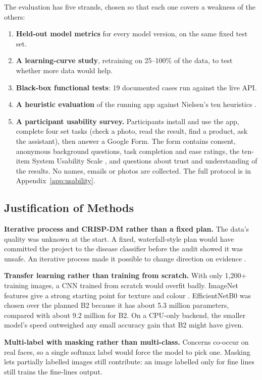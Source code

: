 The evaluation has five strands, chosen so that each one covers a weakness of the others:
\begin{enumerate}
  \item \textbf{Held-out model metrics} for every model version, on the same fixed test set.
  \item \textbf{A learning-curve study}, retraining on 25--100\% of the data, to test whether more data would help.
  \item \textbf{Black-box functional tests}: 19 documented cases run against the live API.
  \item \textbf{A heuristic evaluation} of the running app against Nielsen's ten heuristics \citep{galavi2024}.
  \item \textbf{A participant usability survey.} Participants install and use the app, complete four set tasks (check a photo, read the result, find a product, ask the assistant), then answer a Google Form. The form contains consent, anonymous background questions, task completion and ease ratings, the ten-item System Usability Scale \citep{vlachogianni2022}, and questions about trust and understanding of the results. No names, emails or photos are collected. The full protocol is in Appendix~\ref{app:usability}.
\end{enumerate}

\subsection{Justification of Methods}

\textbf{Iterative process and CRISP-DM rather than a fixed plan.} The data's quality was unknown at the start. A fixed, waterfall-style plan would have committed the project to the disease classifier before the audit showed it was unsafe. An iterative process made it possible to change direction on evidence \citep{schroer2021}.

\textbf{Transfer learning rather than training from scratch.} With only 1,200+ training images, a CNN trained from scratch would overfit badly. ImageNet features give a strong starting point for texture and colour \citep{zhuang2021}. EfficientNetB0 was chosen over the planned B2 because it has about 5.3 million parameters, compared with about 9.2 million for B2. On a CPU-only backend, the smaller model's speed outweighed any small accuracy gain that B2 might have given.

\textbf{Multi-label with masking rather than multi-class.} Concerns co-occur on real faces, so a single softmax label would force the model to pick one. Masking lets partially labelled images still contribute: an image labelled only for fine lines still trains the fine-lines output.

